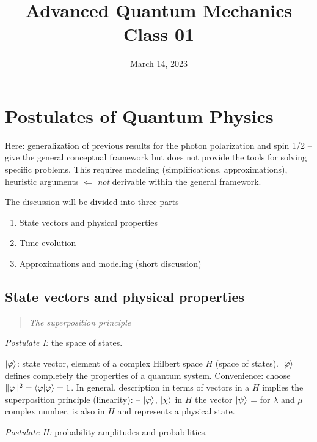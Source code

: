 \documentclass[12pt]{article}
\title{Advanced Quantum Mechanics\\Class 01}
\date{March 14, 2023}                                           %
\begin{document}
\maketitle



\section{Postulates of Quantum Physics}

Here: generalization of previous results for
the photon polarization and spin 1/2
-- give the general conceptual framework
but does not provide the tools for
solving specific problems.
This requires modeling (simplifications, approximations),
heuristic arguments $\Leftarrow$ \emph{not} derivable within
the general framework.

The discussion will be divided into three parts
\begin{enumerate}
\item State vectors and physical properties
\item Time evolution
\item Approximations and modeling (short discussion)
\end{enumerate}

\subsection{State vectors and physical properties}
\begin{quote}
\emph{The superposition principle}
\end{quote}

\emph{Postulate I:} the space of states.

$\ket{\varphi}$: state vector, element of a complex Hilbert
 space $H$ (space of states).
 $\ket{\varphi}$ defines completely the properties of a quantum system.
Convenience: choose $\|\varphi\|^2 = \bra{\varphi}\ket{\varphi} = 1$.
In general, description in terms of vectors in a $H$
implies the superposition principle (linearity):
-- $\ket{\varphi}$, $\ket{\chi}$ in $H$ the vector $\ket{\psi}$
\be
\ket{\psi} = 
\ee
for $\lambda$ and $\mu$ complex number, is also in $H$
and represents a physical state.

\emph{Postulate II:} probability amplitudes and probabilities.
\end{document}
